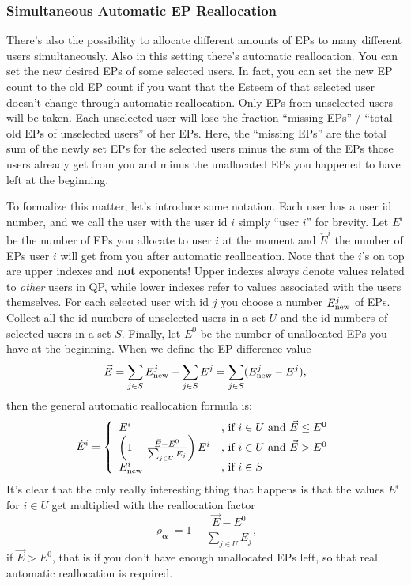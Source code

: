 \documentclass[a4paper,12pt]{scrartcl}
\newcounter{formula}
\newcounter{comment}
\begin{document}
\subsubsection{Simultaneous Automatic EP Reallocation}
There's also the possibility to allocate different amounts of EPs to many different users simultaneously. Also in this setting there's automatic reallocation. You can set the new desired EPs of some selected users. In fact, you can set the new EP count to the old EP count if you want that the Esteem of that selected user doesn't change through automatic reallocation. Only EPs from unselected users will be taken. Each unselected user will lose the fraction ``missing EPs'' / ``total old EPs of unselected users'' of her EPs. Here, the ``missing EPs'' are the total sum of the newly set EPs for the selected users minus the sum of the EPs those users already get from you and minus the unallocated EPs you happened to have left at the beginning.

\begin{mdframed}[style=formula, comment=EP Reallocation Formula]
To formalize this matter, let's introduce some notation. Each user has a user id number, and we call the user with the user id $i$ simply ``user $i$'' for brevity. Let $E^i$ be the number of EPs you allocate to user $i$ at the moment and $\check{E}^i$ the number of EPs user $i$ will get from you after automatic reallocation. Note that the $i$'s on top are upper indexes and \textbf{not} exponents! Upper indexes always denote values related to \textit{other} users in QP, while lower indexes refer to values associated with the users themselves. For each selected user with id $j$ you choose a number $E^j_{\mbox{\scriptsize{new}}}$ of EPs. Collect all the id numbers of unselected users in a set $U$ and the id numbers of selected users in a set $S$. Finally, let $E^0$ be the number of unallocated EPs you have at the beginning. When we define the EP difference value
$$\vec{E} = \sum_{j \in S} E^j_{\mbox{\scriptsize{new}}} - \sum_{j \in S} E^j = \sum_{j \in S} (E^j_{\mbox{\scriptsize{new}}} - E^j), $$
then the general automatic reallocation formula is:
$$\check{E}^i = \left\{ \begin{array}{ll}
E^i & \mbox{, if } i \in U \mbox{ and } \vec{E} \leq E^0 \\
\left(1 - \frac{\vec{E} - E^0}{\sum_{j \in U} E_j}\right) E^i & \mbox{, if } i \in U  \mbox{ and } \vec{E} > E^0 \\
E^i_{\mbox{\scriptsize{new}}}  & \mbox{, if } i \in S
\end{array}\right.$$
It's clear that the only really interesting thing that happens is that the values $E^i$ for $i \in U$ get multiplied with the reallocation factor
$$\mathbf{\varrho_{\alpha}} = 1 - \frac{\vec{E} - E^0}{\sum_{j \in U} E_j},$$
if $\vec{E} > E^0$, that is if you don't have enough unallocated EPs left, so that real automatic reallocation is required.
\end{mdframed}
\end{document}
